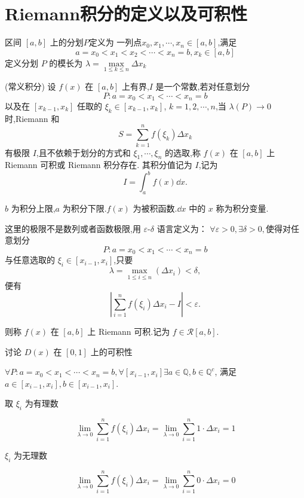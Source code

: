 \section{Riemann积分的定义以及可积性}
\begin{definition}
	区间 \([a, b]\) 上的分划$P$定义为 一列点$x_0,x_1,\cdots,x_n\in[a,b]$,满足\[  a = x_0 < x_1 < x_2 < \cdots < x_n = b, x_k \in [a, b]\]
	定义分划 \(P\) 的模长为 \(\lambda = \max\limits_{1 \leq k \leq n} \Delta x_k\)
\end{definition}
\begin{definition}(常义积分)
	设 \( f(x) \) 在 \([a, b]\) 上有界,\(I\) 是一个常数,若对任意划分  
	\[
	P: a = x_0 < x_1 < \cdots < x_n = b
	\]  
	以及在 \([x_{k-1}, x_k]\) 任取的 \(\xi_k \in [x_{k-1}, x_k]\), \(k = 1, 2, \cdots, n\),当 \(\lambda(P) \to 0\) 时,Riemann 和  
	\[
	S = \sum_{k=1}^n f(\xi_k) \Delta x_k
	\]  
	有极限 \(I\),且不依赖于划分的方式和 \(\xi_1, \cdots, \xi_n\) 的选取,称 \(f(x)\) 在 \([a, b]\) 上 Riemann 可积或 Riemann 积分存在.  
	其积分值记为 \(I\),记为  
	\[
	I = \int_a^b f(x) \dd x.
	\]  
	
	\(b\) 为积分上限,\(a\) 为积分下限.\(f(x)\) 为被积函数.\(\dd x\) 中的 \(x\) 称为积分变量.
	
	这里的极限不是数列或者函数极限,用 \(\varepsilon\)-\(\delta\) 语言定义为：  
	$\forall \varepsilon > 0, \exists \delta > 0, $使得对任意划分  
	\[
	P: a = x_0 < x_1 < \cdots < x_n = b
	\]  
	与任意选取的 \(\xi_i \in [x_{i-1}, x_i]\),只要  
	\[
	\lambda = \max_{1 \leq i \leq n} (\Delta x_i) < \delta,
	\]  
	便有  
	\[
	\left| \sum_{i=1}^n f(\xi_i) \Delta x_i - I \right| < \varepsilon.
	\]  
	
	则称 \( f(x) \) 在 \([a, b]\) 上 Riemann 可积.记为 \( f \in \mathcal{R}[a, b] \).
\end{definition}
\begin{example}
	讨论 \( D(x) \) 在 \([0,1]\) 上的可积性
\end{example}
\begin{solution}
	\(\forall P: a = x_0 < x_1 < \cdots < x_n = b, \forall[x_{i-1}, x_i]  \exists a \in \mathbb{Q}, b \in \mathbb{Q}^c\),  
	满足 \(a \in [x_{i-1}, x_i], b \in [x_{i-1}, x_i]\).
	
	取 $\xi_i$ 为有理数
	
	\[\lim_{\lambda \to 0} \sum_{i=1}^n f(\xi_i) \Delta x_i = \lim_{\lambda \to 0} \sum_{i=1}^n 1 \cdot \Delta x_i = 1\]
	
	$\xi_i$ 为无理数
	
	\[\lim_{\lambda \to 0} \sum_{i=1}^n f(\xi_i) \Delta x_i = \lim_{\lambda \to 0} \sum_{i=1}^n 0 \cdot \Delta x_i = 0\]
	
	
\end{solution}
